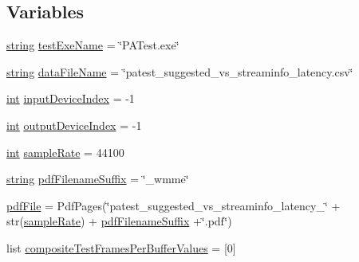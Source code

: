 \subsection*{Variables}
\begin{DoxyCompactItemize}
\item 
\hyperlink{test__lib_f_l_a_c_2format_8c_ab02026ad0de9fb6c1b4233deb0a00c75}{string} \hyperlink{namespacepatest__suggested__vs__streaminfo__latency_a06a2ea4a2e1d432bfb9f16ff153f2370}{test\+Exe\+Name} = \char`\"{}P\+A\+Test.\+exe\char`\"{}
\item 
\hyperlink{test__lib_f_l_a_c_2format_8c_ab02026ad0de9fb6c1b4233deb0a00c75}{string} \hyperlink{namespacepatest__suggested__vs__streaminfo__latency_affbd9ac2873049fcdadb2cf2aad0949e}{data\+File\+Name} = \char`\"{}patest\+\_\+suggested\+\_\+vs\+\_\+streaminfo\+\_\+latency.\+csv\char`\"{}
\item 
\hyperlink{xmltok_8h_a5a0d4a5641ce434f1d23533f2b2e6653}{int} \hyperlink{namespacepatest__suggested__vs__streaminfo__latency_ad74185b92e44993730a14a8847776c4e}{input\+Device\+Index} = -\/1
\item 
\hyperlink{xmltok_8h_a5a0d4a5641ce434f1d23533f2b2e6653}{int} \hyperlink{namespacepatest__suggested__vs__streaminfo__latency_a2c1f99e6ac4c129fa6a4847bcff6f80e}{output\+Device\+Index} = -\/1
\item 
\hyperlink{xmltok_8h_a5a0d4a5641ce434f1d23533f2b2e6653}{int} \hyperlink{namespacepatest__suggested__vs__streaminfo__latency_a14f2ecd6f756d329f6df4096833062d0}{sample\+Rate} = 44100
\item 
\hyperlink{test__lib_f_l_a_c_2format_8c_ab02026ad0de9fb6c1b4233deb0a00c75}{string} \hyperlink{namespacepatest__suggested__vs__streaminfo__latency_ad2878f6ec171540823ed101d29d1d8a5}{pdf\+Filename\+Suffix} = \char`\"{}\+\_\+wmme\char`\"{}
\item 
\hyperlink{namespacepatest__suggested__vs__streaminfo__latency_a5c9596f476ca4e898f5a46bc436492c6}{pdf\+File} = Pdf\+Pages(\char`\"{}patest\+\_\+suggested\+\_\+vs\+\_\+streaminfo\+\_\+latency\+\_\+\char`\"{} + str(\hyperlink{namespacepatest__suggested__vs__streaminfo__latency_a14f2ecd6f756d329f6df4096833062d0}{sample\+Rate}) + \hyperlink{namespacepatest__suggested__vs__streaminfo__latency_ad2878f6ec171540823ed101d29d1d8a5}{pdf\+Filename\+Suffix} +\char`\"{}.pdf\char`\"{})
\item 
list \hyperlink{namespacepatest__suggested__vs__streaminfo__latency_a95e3e59fd57bf6e6a27015f1fe8ed8b6}{composite\+Test\+Frames\+Per\+Buffer\+Values} = \mbox{[}0\mbox{]}
\item 

\end{DoxyCompactItemize}
